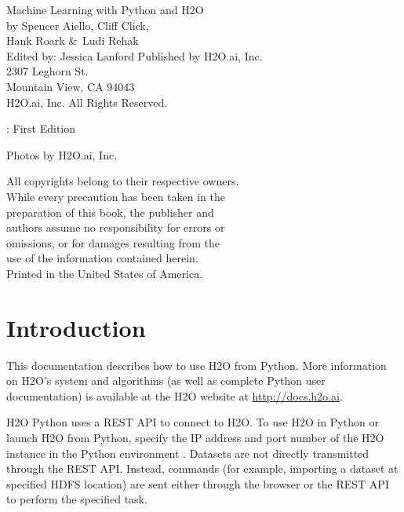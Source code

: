 \newpage
\restoregeometry

\null\vfill %

\thispagestyle{empty}%

{\raggedright 

Machine Learning with Python and H2O\\
  by Spencer Aiello, Cliff Click, \\ Hank Roark \&\  Ludi Rehak\\
Edited by: Jessica Lanford
\bigskip
  Published by H2O.ai, Inc. \\
2307 Leghorn St. \\
Mountain View, CA 94043\\
\bigskip
\textcopyright \the\year \hspace{1pt} H2O.ai, Inc. All Rights Reserved. 
\bigskip

\monthname \hspace{1pt}  \the\year: First Edition 
\bigskip

Photos by \textcopyright H2O.ai, Inc.
\bigskip

All copyrights belong to their respective owners.\\
While every precaution has been taken in the\\
preparation of this book, the publisher and\\
authors assume no responsibility for errors or\\
omissions, or for damages resulting from the\\
use of the information contained herein.\\
\bigskip
Printed in the United States of America. 
}


\newpage
\thispagestyle{empty}%

\tableofcontents
\thispagestyle{empty}%

\newpage

\section{Introduction}

This documentation describes how to use H2O from Python. More information on H2O's system and algorithms
(as well as complete Python user documentation) is available at the H2O website at {\url{http://docs.h2o.ai}}.

H2O Python uses a REST API to connect to H2O. To use H2O in Python or launch H2O from Python, specify the IP address and port number of the H2O instance in the Python environment . Datasets are not directly transmitted
through the REST API. Instead, commands (for example, importing a dataset at specified HDFS location) are sent either through the browser or the REST API to perform the specified task.

